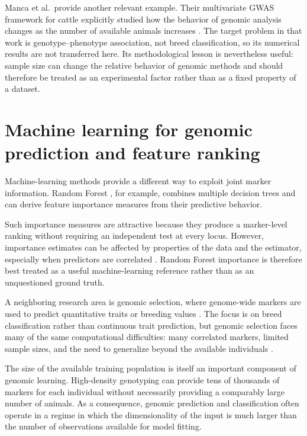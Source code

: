 Manca et al.\ provide another relevant example. Their multivariate
GWAS framework for cattle explicitly studied how the behavior of
genomic analysis changes as the number of available animals increases
\cite{manca2020multivariate}. The target problem in that work is
genotype--phenotype association, not breed classification, so its
numerical results are not transferred here. Its
methodological lesson is nevertheless useful: sample size can change
the relative behavior of genomic methods and should therefore be
treated as an experimental factor rather than as a fixed property of
a dataset.



\section{Machine learning for genomic prediction and feature ranking}
\label{sec:ml_genomics}

Machine-learning methods provide a different way to exploit joint
marker information. Random Forest \cite{breiman2001random}, for
example, combines multiple decision trees and can derive feature
importance measures from their predictive behavior.

Such importance measures are attractive because they produce a
marker-level ranking without requiring an independent test at every
locus. However, importance estimates can be affected by properties of
the data and the estimator, especially when predictors are correlated
\cite{strobl2007bias, nicodemus2010correlation}. Random Forest
importance is therefore best treated as a useful machine-learning
reference rather than as an unquestioned ground truth.

A neighboring research area is genomic selection, where genome-wide
markers are used to predict quantitative traits or breeding values
\cite{meuwissen2001prediction}. The focus is on breed classification
rather than continuous trait prediction, but genomic selection faces
many of the same computational difficulties: many
correlated markers, limited sample sizes, and the need to generalize
beyond the available individuals
\cite{georges2019livestock, chafai2023mlanimal}.

The size of the available training population is itself an important
component of genomic learning. High-density genotyping can provide tens
of thousands of markers for each individual without necessarily
providing a comparably large number of animals. As a consequence,
genomic prediction and classification often operate in a regime in
which the dimensionality of the input is much larger than the number
of observations available for model fitting.


